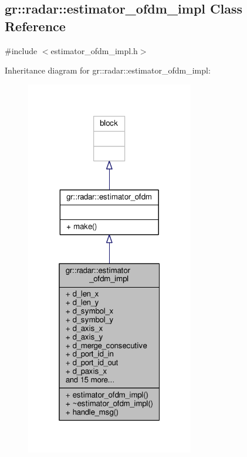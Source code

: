 \subsection{gr\+:\+:radar\+:\+:estimator\+\_\+ofdm\+\_\+impl Class Reference}
\label{classgr_1_1radar_1_1estimator__ofdm__impl}


{\ttfamily \#include $<$estimator\+\_\+ofdm\+\_\+impl.\+h$>$}



Inheritance diagram for gr\+:\+:radar\+:\+:estimator\+\_\+ofdm\+\_\+impl\+:
\nopagebreak
\begin{figure}[H]
\begin{center}
\leavevmode
\includegraphics[width=208pt]{d9/d6d/classgr_1_1radar_1_1estimator__ofdm__impl__inherit__graph}
\end{center}
\end{figure}


